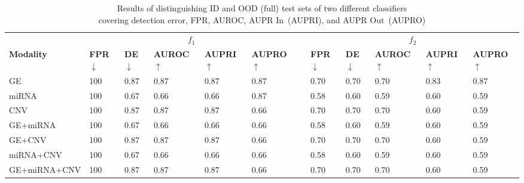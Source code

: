 \begin{table}
	\centering
	\caption{Results of distinguishing ID and OOD (full) test sets of two different classifiers\\ covering detection error, FPR, AUROC, AUPR In~(AUPRI), and AUPR Out~(AUPRO)} 
	\vspace{-4mm}
	\begin{tabular}{llllllllllll}
		&\multicolumn{5}{c}{\bfseries{$f_1$}} && \multicolumn{5}{c}{\bfseries{$f_2$}} \\	
		\cmidrule{2-6}\cmidrule{8-12}   
		\textbf{Modality}&\textbf{FPR$\downarrow$} & \textbf{DE$\downarrow$} & \textbf{AUROC$\uparrow$} & \textbf{AUPRI$\uparrow$} & \textbf{AUPRO$\uparrow$}
		&& \textbf{FPR$\downarrow$} & \textbf{DE$\downarrow$} & \textbf{AUROC$\uparrow$} & \textbf{AUPRI$\uparrow$} & \textbf{AUPRO$\uparrow$}\\
		\hline
		\multirow{1}{*}{{GE}} & 100 & 0.87 & 0.87 & 0.87 & 0.87 && 0.70 & 0.70 & 0.70 & 0.83 & 0.87\\
		\hline
		\multirow{1}{*}{{miRNA}} & 100 & 0.67 & 0.66 & 0.66 & 0.87 && 0.58 & 0.60 & 0.59 & 0.60 & 0.59\\
		\hline
		\multirow{1}{*}{{CNV}} & 100 & 0.87 & 0.87 & 0.87 & 0.66 && 0.70 & 0.70 & 0.70 & 0.60 & 0.59\\
		\hline
		\multirow{1}{*}{{GE+miRNA}} & 100 & 0.67 & 0.66 & 0.66 & 0.66 && 0.58 & 0.60 & 0.59 & 0.60 & 0.59\\
		\hline
		\multirow{1}{*}{{GE+CNV}} & 100 & 0.87 & 0.87 & 0.87 & 0.66 && 0.70 & 0.70 & 0.70 & 0.60 & 0.59\\
		\hline
		\multirow{1}{*}{{miRNA+CNV}} & 100 & 0.67 & 0.66 & 0.66 & 0.66 && 0.58 & 0.60 & 0.59 & 0.60 & 0.59\\
		\hline
		\multirow{1}{*}{{GE+miRNA+CNV}} & 100 & 0.87 & 0.87 & 0.87 & 0.66 && 0.70 & 0.70 & 0.70 & 0.60 & 0.59\\
		\hline
	\end{tabular} %
	\vspace{-2mm}
	\label{Table:OOD_result_2}
\end{table}

